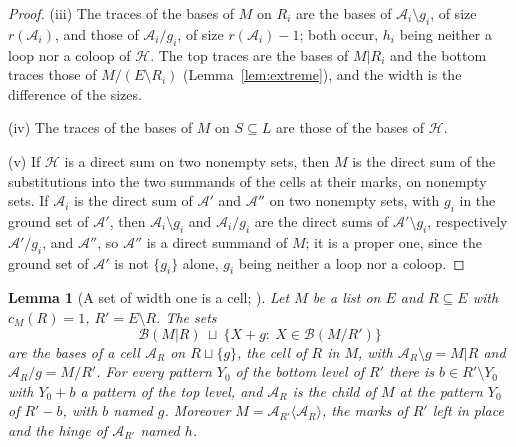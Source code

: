 \documentclass[11pt]{article}
\theoremstyle{plain}
\newtheorem{lemma}[prop]{Lemma}
\theoremstyle{definition}
\theoremstyle{remark}
\newcommand{\cB}{\mathcal B}
\begin{document}
\begin{proof}
(iii) The traces of the bases of $M$ on $R_i$ are the bases of $\mathcal A_i\setminus g_i$, of size $r(\mathcal A_i)$, and those of $\mathcal A_i/g_i$, of size $r(\mathcal A_i)-1$; both occur, $h_i$ being neither a loop nor a coloop of $\mathcal H$. The top traces are the bases of $M|R_i$ and the bottom traces those of $M/(E\setminus R_i)$ (Lemma~\ref{lem:extreme}), and the width is the difference of the sizes.

(iv) The traces of the bases of $M$ on $S\subseteq L$ are those of the bases of $\mathcal H$.

(v) If $\mathcal H$ is a direct sum on two nonempty sets, then $M$ is the direct sum of the substitutions into the two summands of the cells at their marks, on nonempty sets. If $\mathcal A_i$ is the direct sum of $\mathcal A'$ and $\mathcal A''$ on two nonempty sets, with $g_i$ in the ground set of $\mathcal A'$, then $\mathcal A_i\setminus g_i$ and $\mathcal A_i/g_i$ are the direct sums of $\mathcal A'\setminus g_i$, respectively $\mathcal A'/g_i$, and $\mathcal A''$, so $\mathcal A''$ is a direct summand of $M$; it is a proper one, since the ground set of $\mathcal A'$ is not $\{g_i\}$ alone, $g_i$ being neither a loop nor a coloop.
\end{proof}

\begin{lemma}[A set of width one is a cell; {\cite[Prop.~12.5, p.~70; Thm.~18.6, p.~116; Prop.~20.3(iii), p.~164]{F}}]\label{lem:cellofset}
Let $M$ be a list on $E$ and $R\subseteq E$ with $c_M(R)=1$, $R'=E\setminus R$. The sets
\[
\cB(M|R)\ \sqcup\ \{X+g:\ X\in\cB(M/R')\}
\]
are the bases of a cell $\mathcal A_R$ on $R\sqcup\{g\}$, the \emph{cell of $R$ in $M$}, with $\mathcal A_R\setminus g=M|R$ and $\mathcal A_R/g=M/R'$. For every pattern $Y_0$ of the bottom level of $R'$ there is $b\in R'\setminus Y_0$ with $Y_0+b$ a pattern of the top level, and $\mathcal A_R$ is the child of $M$ at the pattern $Y_0$ of $R'-b$, with $b$ named $g$. Moreover $M=\mathcal A_{R'}\langle\mathcal A_R\rangle$, the marks of $R'$ left in place and the hinge of $\mathcal A_{R'}$ named $h$.
\end{lemma}
\end{document}
